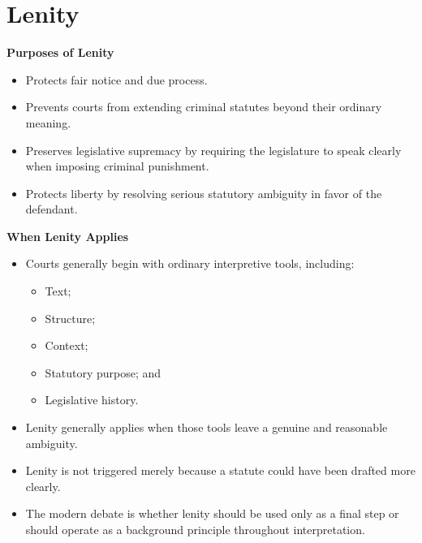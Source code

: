 \documentclass[11pt]{tex/lawoutline}
\begin{document}
\section{Lenity}


\textbf{Purposes of Lenity}{
\begin{itemize}
    \item Protects fair notice and due process.
    \item Prevents courts from extending criminal statutes beyond their ordinary meaning.
    \item Preserves legislative supremacy by requiring the legislature to speak clearly when imposing criminal punishment.
    \item Protects liberty by resolving serious statutory ambiguity in favor of the defendant.
\end{itemize}
}

\textbf{When Lenity Applies}{
\begin{itemize}
    \item Courts generally begin with ordinary interpretive tools, including:
    \begin{itemize}
        \item Text;
        \item Structure;
        \item Context;
        \item Statutory purpose; and
        \item Legislative history.
    \end{itemize}
    \item Lenity generally applies when those tools leave a genuine and reasonable ambiguity.
    \item Lenity is not triggered merely because a statute could have been drafted more clearly.
    \item The modern debate is whether lenity should be used only as a final step or should operate as a background principle throughout interpretation.
\end{itemize}
}

\end{document}
